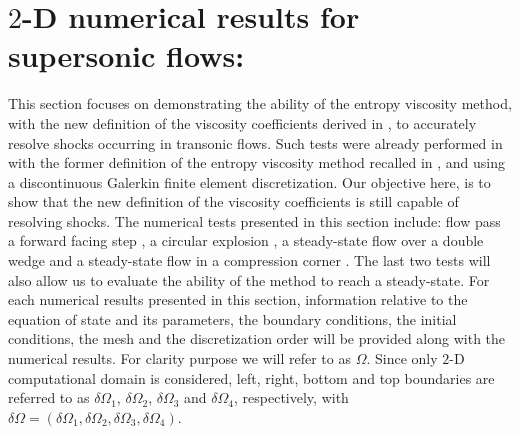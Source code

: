 \section{$2$-D numerical results for supersonic flows:} \label{sec:2d-supersonic-results}
This section focuses on demonstrating the ability of the entropy viscosity method, with the new definition of the viscosity coefficients derived in , to accurately resolve shocks occurring in transonic flows. Such tests were already performed in \cite{valentin} with the former definition of the entropy viscosity method recalled in , and using a discontinuous Galerkin finite element discretization. Our objective here, is to show that the new definition of the viscosity coefficients is still capable of resolving shocks. The numerical tests presented in this section include: flow pass a forward facing step \cite{FFS}, a circular explosion \cite{Toro}, a steady-state flow over a double wedge \cite{RichThesis} and a steady-state flow in a compression corner \cite{CompressionCorner}. The last two tests will also allow us to evaluate the ability of the method to reach a steady-state. For each numerical results presented in this section, information relative to the equation of state and its parameters, the boundary conditions, the initial conditions, the mesh and the discretization order will be provided along with the numerical results. For clarity purpose we will refer to as $\Omega$. Since only $2$-D computational domain is considered, left, right, bottom and top boundaries are referred to as $\delta \Omega_1$, $\delta \Omega_2$, $\delta \Omega_3$ and $\delta \Omega_4$, respectively, with $\delta \Omega = ( \delta \Omega_1,  \delta \Omega_2, \delta \Omega_3, \delta \Omega_4)$. 
